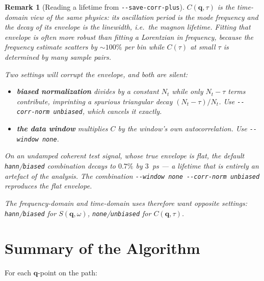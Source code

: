 \documentclass[12pt, a4paper, oneside]{article}
\newtheorem{remark}[theorem]{Remark}
\newcommand{\qvec}{\mathbf{q}}
\newcommand{\Nt}{N_t}
\begin{document}
\begin{remark}[Reading a lifetime from \texttt{-\/-save-corr-plus}]
\label{rem:corrplus}
$C(\qvec,\tau)$ is the time-domain view of the same physics: its oscillation
period is the mode frequency and the decay of its envelope is the linewidth,
i.e.\ the magnon lifetime. Fitting that envelope is often more robust than
fitting a Lorentzian in frequency, because the frequency estimate scatters by
$\sim100\%$ per bin while $C(\tau)$ at small $\tau$ is determined by many sample
pairs.

Two settings will corrupt the envelope, and both are silent:
\begin{itemize}
    \item \textbf{biased normalization} divides by a constant $\Nt$ while only
    $\Nt-\tau$ terms contribute, imprinting a spurious triangular decay
    $(\Nt-\tau)/\Nt$. Use \texttt{-\/-corr-norm unbiased}, which cancels it
    exactly.
    \item \textbf{the data window} multiplies $C$ by the window's own
    autocorrelation. Use \texttt{-\/-window none}.
\end{itemize}
On an undamped coherent test signal, whose true envelope is flat, the default
\texttt{hann}/\texttt{biased} combination decays to $0.7\%$ by $3$~ps --- a
lifetime that is entirely an artefact of the analysis. The combination
\texttt{-\/-window none -\/-corr-norm unbiased} reproduces the flat envelope.

The frequency-domain and time-domain uses therefore want \emph{opposite}
settings: \texttt{hann}/\texttt{biased} for $S(\qvec,\omega)$,
\texttt{none}/\texttt{unbiased} for $C(\qvec,\tau)$.
\end{remark}

\section{Summary of the Algorithm}

For each $\qvec$-point on the path:
\end{document}
